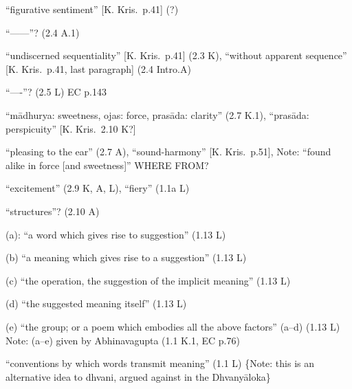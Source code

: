\documentclass[12pt]{article}
\begin{document}
\begin{multicols}{2}
\begin{enumerate}
		 ``figurative sentiment'' [K. Kris.\ p.41] (?)

		 ``------''? (2.4 A.1)

		 ``undiscerned sequentiality'' [K. Kris.\ p.41] (2.3 K), ``without apparent sequence'' [K. Kris.\ p.41, last paragraph] (2.4 Intro.A)

		 ``----''? (2.5 L) EC p.143

		 ``mādhurya: sweetness, ojas: force, prasāda: clarity'' (2.7 K.1), ``prasāda: perspicuity'' [K. Kris.\ 2.10 K?]

		 ``pleasing to the ear'' (2.7 A), ``sound-harmony'' [K. Kris.\ p.51], Note: ``found alike in force [and sweetness]'' WHERE FROM?

		 ``excitement'' (2.9 K, A, L), ``fiery'' (1.1a L)

		 ``structures''? (2.10 A)



		 (a): ``a word which gives rise to suggestion'' (1.13 L)

		 (b) ``a meaning which gives rise to a suggestion'' (1.13 L)

		 (c) ``the operation, the suggestion of the implicit meaning'' (1.13 L)

		 (d) ``the suggested meaning itself'' (1.13 L)

		 (e) ``the group; or a poem which embodies all the above factors'' (a--d) (1.13 L) Note: (a--e) given by Abhinavagupta (1.1 K.1, EC p.76)

		  ``conventions by which words transmit meaning'' (1.1 L) \{Note: this is an alternative idea to dhvani, argued against in the Dhvanyāloka\}


\end{enumerate}
\end{multicols}
\end{document}
